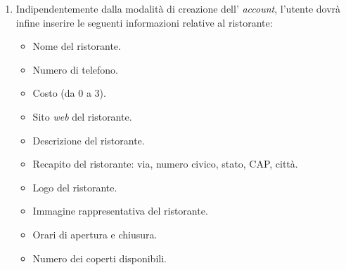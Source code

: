 \begin{itemize}
\begin{enumerate}
            \item Indipendentemente dalla modalità di creazione dell' \textit{account}, l'utente dovrà infine inserire le seguenti informazioni relative al ristorante:
                \begin{itemize}
                    \item Nome del ristorante.
                    \item Numero di telefono.
					\item Costo (da 0 a 3).
                    \item Sito \textit{web} del ristorante.
                    \item Descrizione del ristorante.
                    \item Recapito del ristorante: via, numero civico, stato, CAP, città.
                    \item Logo del ristorante.
                    \item Immagine rappresentativa del ristorante.
                    \item Orari di apertura e chiusura.
                    \item Numero dei coperti disponibili.
                \end{itemize}
	\end{enumerate}
\end{itemize}

